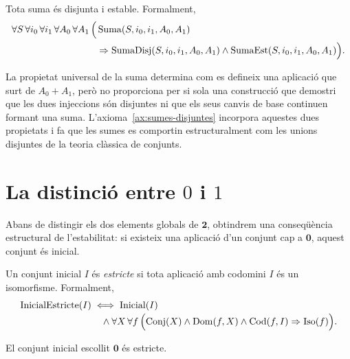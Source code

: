 \begin{axioma}\label{ax:sumes-disjuntes}
Tota suma és disjunta i estable. Formalment,
\[
\begin{aligned}
\forall S\,\forall i_0\,\forall i_1\,
\forall A_0\,\forall A_1\,
\Bigl(&
\operatorname{Suma}(S,i_0,i_1,A_0,A_1)
\\
&{}\Rightarrow
\operatorname{SumaDisj}(S,i_0,i_1,A_0,A_1)
\land
\operatorname{SumaEst}(S,i_0,i_1,A_0,A_1)
\Bigr).
\end{aligned}
\]
\end{axioma}

\begin{observacio}\label{obs:necessitat-axioma}
La propietat universal de la suma determina com es defineix una
aplicació que surt de \(A_0+A_1\), però no proporciona per si sola una
construcció que demostri que les dues injeccions són
disjuntes ni que els seus canvis de base continuen formant una suma.
L'axioma~\ref{ax:sumes-disjuntes} incorpora aquestes dues propietats i
fa que les sumes es comportin estructuralment com les unions disjuntes
de la teoria clàssica de conjunts.
\end{observacio}

\section{La distinció entre \texorpdfstring{\(0\) i \(1\)}{0 i 1}}\label{sec:zero-u}

Abans de distingir els dos elements globals de \(\mathbf2\), obtindrem
una conseqüència estructural de l'estabilitat: si existeix una aplicació
d'un conjunt cap a \(\mathbf0\), aquest conjunt és inicial.

\begin{definicio}\label{def:inicial-estricte}
Un conjunt inicial \(I\) és \emph{estricte} si tota aplicació amb
codomini \(I\) és un isomorfisme. Formalment,
\[
\begin{aligned}
\operatorname{InicialEstricte}(I)
&\iff
\operatorname{Inicial}(I)
\\[-0.2em]
&\quad{}\land
\forall X\,\forall f\,
\Bigl(
\operatorname{Conj}(X)
\land\operatorname{Dom}(f,X)\land\operatorname{Cod}(f,I)
\Rightarrow\operatorname{Iso}(f)
\Bigr).
\end{aligned}
\]
\end{definicio}

\begin{proposicio}\label{prop:inicial-estricte}
El conjunt inicial escollit \(\mathbf0\) és estricte.
\end{proposicio}

